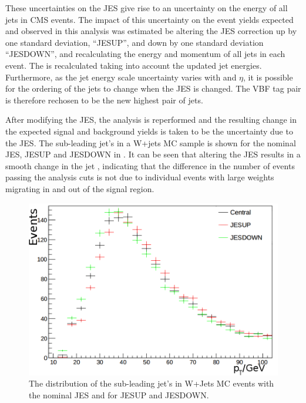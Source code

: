 These uncertainties on the \ac{JES} give rise to an uncertainty on the energy of all jets in CMS events. The impact of this uncertainty on the event yields expected and observed in this analysis was estimated be altering the \ac{JES} correction up by one standard deviation, ``JESUP'', and down by one standard deviation ``JESDOWN'', and recalculating the energy and momentum of all jets in each event. The \MET is recalculated taking into account the updated jet energies. Furthermore, as the jet energy scale uncertainty varies with \pt and $\eta$, it is possible for the \pt ordering of the jets to change when the \ac{JES} is changed. The \ac{VBF} tag pair is therefore rechosen to be the new highest \pt pair of jets. 

After modifying the \ac{JES}, the analysis is reperformed and the resulting change in the expected signal and background yields is taken to be the uncertainty due to the \ac{JES}. The sub-leading jet's \pt in a W+jets \ac{MC} sample is shown for the nominal \ac{JES}, JESUP and JESDOWN in . It can be seen that altering the \ac{JES} results in a smooth change in the jet \pt, indicating that the difference in the number of events passing the analysis cuts is not due to individual events with large weights migrating in and out of the signal region.

\begin{figure}
  \includegraphics[width=\largefigwidth]{plots/prompt/jescheckzoom.png}
  \caption{The distribution of the sub-leading jet's \pt in W+Jets \ac{MC} events with the nominal \ac{JES} and for JESUP and JESDOWN.}
  \label{fig:promptjes}
\end{figure}

